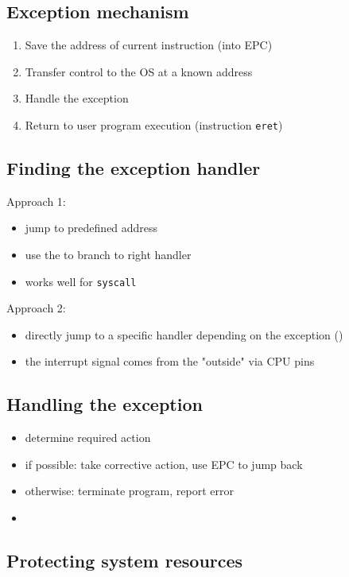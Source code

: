 \documentclass{article}
\newcommand{\T}[1]{\texttt{#1}}
\begin{document}
\subsection{Exception mechanism}

\begin{enumerate}
	\item Save the address of current instruction (into EPC)
	\item Transfer control to the OS at a known address
	\item Handle the exception
	\item Return to user program execution (instruction \T{eret})
\end{enumerate}

\subsection{Finding the exception handler}

Approach 1:
\begin{itemize}
	\item jump to predefined address
	\item use the  to branch to right handler
	\item works well for \T{syscall}
\end{itemize}

Approach 2:
\begin{itemize}
	\item directly jump to a specific handler depending on the exception ()
	\item the interrupt signal comes from the "outside" via CPU pins
\end{itemize}

\subsection{Handling the exception}

\begin{itemize}
	\item determine required action
	\item if possible: take corrective action, use EPC to jump back
	\item otherwise: terminate program, report error
	\item {}
\end{itemize}

\subsection{Protecting system resources}
\end{document}
